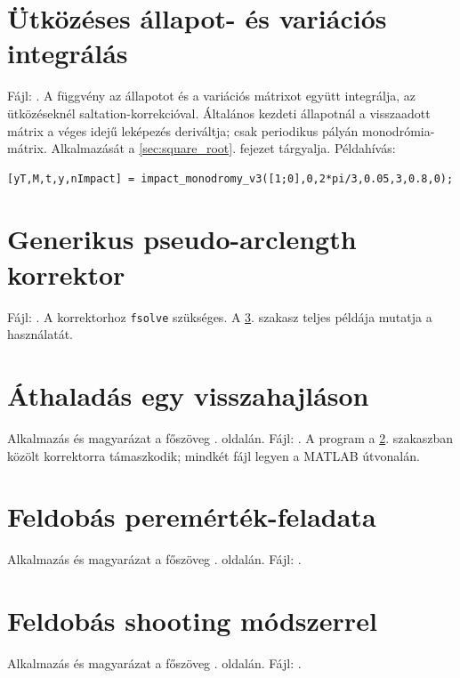 \clearpage
\section{Ütközéses állapot- és variációs integrálás}\label{ap:codes1}
Fájl: .
A függvény az állapotot és a variációs mátrixot együtt integrálja, az ütközéseknél saltation-korrekcióval. Általános kezdeti állapotnál a visszaadott mátrix a véges idejű leképezés deriváltja; csak periodikus pályán monodrómia-mátrix. Alkalmazását a \ref{sec:square_root}. fejezet tárgyalja. Példahívás:
\begin{lstlisting}[numbers=none]
[yT,M,t,y,nImpact] = impact_monodromy_v3([1;0],0,2*pi/3,0.05,3,0.8,0);
\end{lstlisting}


\clearpage
\section{Generikus pseudo-arclength korrektor}\label{ap:pal}
Fájl: .
A korrektorhoz \texttt{fsolve} szükséges. A \ref{ap:fold}. szakasz teljes példája mutatja a használatát.


\clearpage
\section{Áthaladás egy visszahajláson}\label{ap:fold}
Alkalmazás és magyarázat a főszöveg \pageref{use:fold}. oldalán. 
Fájl: .
A program a \ref{ap:pal}. szakaszban közölt korrektorra támaszkodik; mindkét fájl legyen a MATLAB útvonalán.


\clearpage
\section{Feldobás peremérték-feladata}\label{ap:apex_bvp}
Alkalmazás és magyarázat a főszöveg \pageref{use:apex_bvp}. oldalán. 
Fájl: .


\clearpage
\section{Feldobás shooting módszerrel}\label{ap:apex_shooting}
Alkalmazás és magyarázat a főszöveg \pageref{use:apex_shooting}. oldalán. 
Fájl: .


